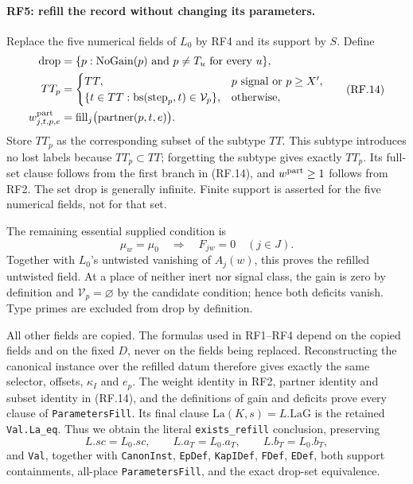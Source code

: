 \documentclass[11pt,a4paper]{article}
\numberwithin{equation}{section}
\theoremstyle{remark}\newtheorem{remark}[theorem]{Remark}
\begin{document}
\paragraph{RF5: refill the record without changing its parameters.}
Replace the five numerical fields of $L_0$ by RF4 and its support by
$S$. Define
\[
 \begin{split}
 \mathrm{drop}&=\{p:\operatorname{NoGain}(p)\text{ and }p\ne T_u
                                             \text{ for every }u\},\\
 TT_p&=\begin{cases}TT,&p\text{ signal or }p\geq X',\\
 \{t\in TT:\operatorname{bs}(\operatorname{step}_p,t)\in\mathcal V_p\},
                                                       &\text{otherwise},
 \end{cases}\\
 w^{\rm part}_{j,t,p,e}&=\operatorname{fill}_j
             \bigl(\operatorname{partner}(p,t,e)\bigr).        
 \end{split}
 \tag{RF.14}
\]
Store $TT_p$ as the corresponding subset of the subtype $TT$. This
subtype introduces no lost labels because $TT_p\subset TT$; forgetting
the subtype gives exactly $TT_p$. Its full-set clause follows from the
first branch in (RF.14), and $w^{\rm part}\geq1$ follows from RF2.
The set $\mathrm{drop}$ is generally infinite. Finite support is asserted
for the five numerical fields, not for that set.

The remaining essential supplied condition is
\[
 \mu_w=\mu_0\quad\Longrightarrow\quad F_{jw}=0\quad(j\in J).
                                                               \tag{RF.15}
\]
Together with $L_0$'s untwisted vanishing of $A_j(w)$, this proves the
refilled untwisted field. At a place of neither inert nor signal class,
the gain is zero by definition and $\mathcal V_p=\varnothing$ by the
candidate condition; hence both deficits vanish. Type primes are excluded
from $\mathrm{drop}$ by definition.

All other fields are copied. The formulas used in RF1--RF4 depend on
the copied fields and on the fixed $D$, never on the fields being replaced.
Reconstructing the canonical instance over the refilled datum therefore
gives exactly the same selector, offsets, $\kappa_I$ and $e_p$.
The weight identity in RF2, partner identity and subset identity in
(RF.14), and the definitions of gain and deficits prove every clause of
\texttt{ParametersFill}. Its final clause $\mathrm{La}(K,s)=L.\mathrm{LaG}$
is the retained \texttt{Val.La\_\allowbreak eq}. Thus we obtain the literal
\texttt{exists\_\allowbreak refill} conclusion, preserving
\[
           L.sc=L_0.sc,\qquad L.a_T=L_0.a_T,\qquad L.b_T=L_0.b_T,
                                                               \tag{RF.16}
\]
and \texttt{Val}, together with \texttt{CanonInst}, \texttt{EpDef},
\texttt{KapIDef}, \texttt{FDef}, \texttt{EDef}, both support containments,
all-place \texttt{ParametersFill}, and the exact drop-set equivalence.
\end{document}
